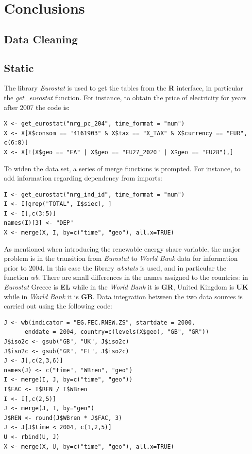\documentclass{book}
\begin{document}
\chapter{Conclusions}

\begin{appendices}
\chapter*{Data Cleaning}
\section*{Static}
The library \textit{Eurostat} is used to get the tables from the \textbf{R} interface, in particular the \textit{get\_eurostat} function. For instance, to obtain the price of electricity for years after 2007 the code is:

\begin{verbatim}
X <- get_eurostat("nrg_pc_204", time_format = "num")
X <- X[X$consom == "4161903" & X$tax == "X_TAX" & X$currency == "EUR", c(6:8)]
X <- X[!(X$geo == "EA" | X$geo == "EU27_2020" | X$geo == "EU28"),]
\end{verbatim}

\noindent To widen the data set, a series of merge functions is prompted. For instance, to add information regarding dependency from imports:

\begin{verbatim}
I <- get_eurostat("nrg_ind_id", time_format = "num")
I <- I[grep("TOTAL", I$siec), ]
I <- I[,c(3:5)]
names(I)[3] <- "DEP"
X <- merge(X, I, by=c("time", "geo"), all.x=TRUE)
\end{verbatim}

\noindent As mentioned when introducing the renewable energy share variable, the major problem is in the transition from \textit{Eurostat} to \textit{World Bank} data for information prior to 2004. In this case the library \textit{wbstats} is used, and in particular the function \textit{wb}. There are small differences in the names assigned to the countries: in \textit{Eurostat} Greece is \textbf{EL} while in the \textit{World Bank} it is \textbf{GR}, United Kingdom is \textbf{UK} while in \textit{World Bank} it is \textbf{GB}. Data integration between the two data sources is carried out using the following code:

\begin{verbatim}
J <- wb(indicator = "EG.FEC.RNEW.ZS", startdate = 2000, 
	  enddate = 2004, country=c(levels(X$geo), "GB", "GR"))
J$iso2c <- gsub("GB", "UK", J$iso2c)
J$iso2c <- gsub("GR", "EL", J$iso2c)
J <- J[,c(2,3,6)]
names(J) <- c("time", "WBren", "geo")
I <- merge(I, J, by=c("time", "geo"))
I$FAC <- I$REN / I$WBren
I <- I[,c(2,5)]
J <- merge(J, I, by="geo")
J$REN <- round(J$WBren * J$FAC, 3)
J <- J[J$time < 2004, c(1,2,5)]
U <- rbind(U, J)
X <- merge(X, U, by=c("time", "geo"), all.x=TRUE)
\end{verbatim}


\end{appendices}
\end{document}
